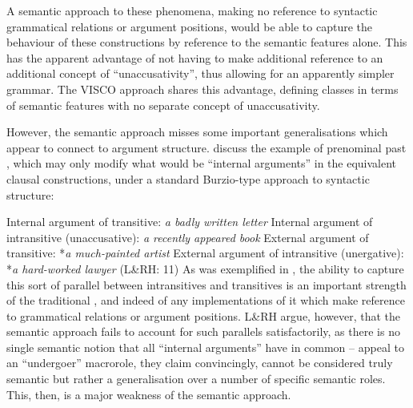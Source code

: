 \documentclass[output=paper]{langsci/langscibook}
\begin{document}
\ea
    \z
\z

\ea
    \z
\z
A semantic approach to these phenomena, making no reference to syntactic
grammatical relations or argument positions, would be able to capture the
behaviour of these constructions by reference to the semantic features alone.
This has the apparent advantage of not having to make additional reference to
an additional concept of \enquote{unaccusativity}, thus allowing for an
apparently simpler grammar. The VISCO approach shares this advantage, defining
classes in terms of semantic features with no separate concept of
unaccusativity.

However, the semantic approach misses some important generalisations which
appear to connect  to argument structure.
\textcite[11--12]{LevinRappaportHovav1995} discuss the example of prenominal
past , which may only modify what would be \enquote{internal
arguments} in the equivalent clausal constructions, under a standard
Burzio-type approach to syntactic structure:

\ea
    \ea Internal argument of transitive: \emph{a badly written letter}
    \ex Internal argument of intransitive (unaccusative): \emph{a recently appeared book}
    \ex External argument of transitive: *\emph{a much-painted artist}
    \ex External argument of intransitive (unergative): *\emph{a hard-worked lawyer} (L\&RH: 11)
    \z
\z
As was exemplified in , the ability to capture this sort of parallel
between intransitives and transitives is an important strength of the
traditional , and indeed of any implementations of it
which make reference to grammatical relations or argument positions. L\&RH
argue, however, that the semantic approach fails to account for such parallels
satisfactorily, as there is no single semantic notion that all
\enquote{internal arguments} have in common --  appeal to an
\enquote{undergoer} macrorole, they claim convincingly, cannot be considered
truly semantic but rather a generalisation over a number of specific semantic
roles.  This, then, is a major weakness of the semantic approach.
\end{document}
